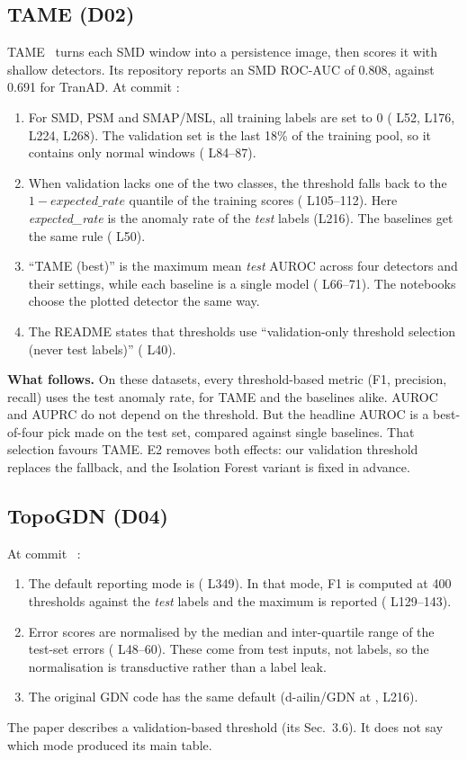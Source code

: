 \subsection{TAME (D02)}
TAME~\cite{D02,tame_repo} turns each SMD window into a persistence image, then scores it with shallow detectors. Its repository reports an SMD ROC-AUC of 0.808, against 0.691 for TranAD. At commit :
\begin{enumerate}
  \item For SMD, PSM and SMAP/MSL, all training labels are set to 0 ( L52, L176, L224, L268). The validation set is the last 18\% of the training pool, so it contains only normal windows ( L84--87).
  \item When validation lacks one of the two classes, the threshold falls back to the $1-\textit{expected\_rate}$ quantile of the training scores ( L105--112). Here \textit{expected\_rate} is the anomaly rate of the \emph{test} labels (L216). The baselines get the same rule ( L50).
  \item ``TAME (best)'' is the maximum mean \emph{test} AUROC across four detectors and their settings, while each baseline is a single model ( L66--71). The notebooks choose the plotted detector the same way.
  \item The README states that thresholds use ``validation-only threshold selection (never test labels)'' ( L40).
\end{enumerate}
\textbf{What follows.} On these datasets, every threshold-based metric (F1, precision, recall) uses the test anomaly rate, for TAME and the baselines alike. AUROC and AUPRC do not depend on the threshold. But the headline AUROC is a best-of-four pick made on the test set, compared against single baselines. That selection favours TAME. E2 removes both effects: our validation threshold replaces the fallback, and the Isolation Forest variant is fixed in advance.

\subsection{TopoGDN (D04)}
At commit ~\cite{D04}:
\begin{enumerate}
  \item The default reporting mode is  ( L349). In that mode, F1 is computed at 400 thresholds against the \emph{test} labels and the maximum is reported ( L129--143).
  \item Error scores are normalised by the median and inter-quartile range of the test-set errors ( L48--60). These come from test inputs, not labels, so the normalisation is transductive rather than a label leak.
  \item The original GDN code has the same default (d-ailin/GDN at ,  L216).
\end{enumerate}
The paper describes a validation-based threshold (its Sec.~3.6). It does not say which mode produced its main table.

